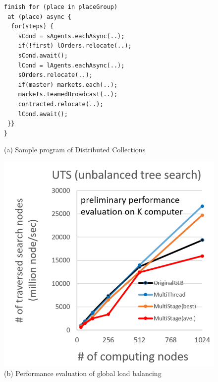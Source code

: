 \begin{figure}
  \begin{minipage}{.33\textwidth}
    \begin{lstlisting}[basicstyle=\tiny, frame=single]
finish for (place in placeGroup)
 at (place) async {
  for(steps) {
    sCond = sAgents.eachAsync(..);
    if(!first) lOrders.relocate(..);
    sCond.await();
    lCond = lAgents.eachAsync(..);
    sOrders.relocate(..);
    if(master) markets.each(..); 
    markets.teamedBroadcast(..);
    contracted.relocate(..);
    lCond.await();
 }}
}
    \end{lstlisting}
  (a) Sample program of Distributed Collections
  \end{minipage}
  \hspace{4pt}
    \begin{minipage}{.3\textwidth}
      \includegraphics[width=\textwidth]{Figs.kamada/glbScale.png}
      (b) Performance evaluation of global load balancing 
    \end{minipage}
      \hspace{4pt}
        \begin{minipage}{.3\textwidth}

\end{minipage}
\end{figure}
